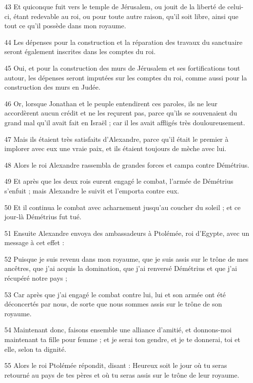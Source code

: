 \par 43 Et quiconque fuit vers le temple de Jérusalem, ou jouit de la liberté de celui-ci, étant redevable au roi, ou pour toute autre raison, qu'il soit libre, ainsi que tout ce qu'il possède dans mon royaume.
\par 44 Les dépenses pour la construction et la réparation des travaux du sanctuaire seront également inscrites dans les comptes du roi.
\par 45 Oui, et pour la construction des murs de Jérusalem et ses fortifications tout autour, les dépenses seront imputées sur les comptes du roi, comme aussi pour la construction des murs en Judée.
\par 46 Or, lorsque Jonathan et le peuple entendirent ces paroles, ils ne leur accordèrent aucun crédit et ne les reçurent pas, parce qu'ils se souvenaient du grand mal qu'il avait fait en Israël ; car il les avait affligés très douloureusement.
\par 47 Mais ils étaient très satisfaits d'Alexandre, parce qu'il était le premier à implorer avec eux une vraie paix, et ils étaient toujours de mèche avec lui.
\par 48 Alors le roi Alexandre rassembla de grandes forces et campa contre Démétrius.
\par 49 Et après que les deux rois eurent engagé le combat, l'armée de Démétrius s'enfuit ; mais Alexandre le suivit et l'emporta contre eux.
\par 50 Et il continua le combat avec acharnement jusqu'au coucher du soleil ; et ce jour-là Démétrius fut tué.
\par 51 Ensuite Alexandre envoya des ambassadeurs à Ptolémée, roi d'Egypte, avec un message à cet effet :
\par 52 Puisque je suis revenu dans mon royaume, que je suis assis sur le trône de mes ancêtres, que j'ai acquis la domination, que j'ai renversé Démétrius et que j'ai récupéré notre pays ;
\par 53 Car après que j'ai engagé le combat contre lui, lui et son armée ont été déconcertés par nous, de sorte que nous sommes assis sur le trône de son royaume.
\par 54 Maintenant donc, faisons ensemble une alliance d'amitié, et donnons-moi maintenant ta fille pour femme ; et je serai ton gendre, et je te donnerai, toi et elle, selon ta dignité.
\par 55 Alors le roi Ptolémée répondit, disant : Heureux soit le jour où tu seras retourné au pays de tes pères et où tu seras assis sur le trône de leur royaume.

